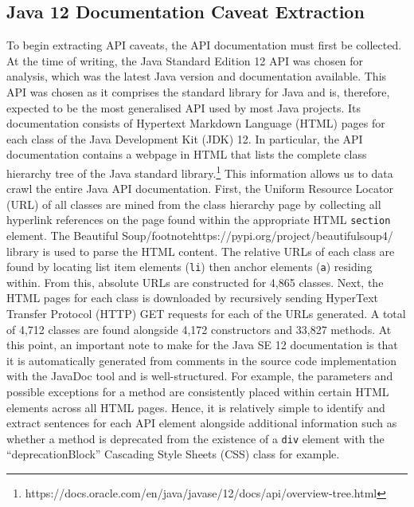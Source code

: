 \subsection{Java 12 Documentation Caveat Extraction}
\label{subsec:info-caveat-extract}
To begin extracting API caveats, the API documentation must first be collected. At the time of writing, the Java Standard Edition 12 API was chosen for analysis, which was the latest Java version and documentation available. This API was chosen as it comprises the standard library for Java and is, therefore, expected to be the most generalised API used by most Java projects. Its documentation consists of Hypertext Markdown Language (HTML) pages for each class of the Java Development Kit (JDK) 12. In particular, the API documentation contains a webpage in HTML that lists the complete class hierarchy tree of the Java standard library.\footnote{https://docs.oracle.com/en/java/javase/12/docs/api/overview-tree.html} This information allows us to data crawl the entire Java API documentation. First, the Uniform Resource Locator (URL) of all classes are mined from the class hierarchy page by collecting all hyperlink references on the page found within the appropriate HTML \lstinline{section} element. The Beautiful Soup/footnote{https://pypi.org/project/beautifulsoup4/} library is used to parse the HTML content. The relative URLs of each class are found by locating list item elements (\lstinline{li}) then anchor elements (\lstinline{a}) residing within. From this, absolute URLs are constructed for 4,865 classes. Next, the HTML pages for each class is downloaded by recursively sending HyperText Transfer Protocol (HTTP) GET requests for each of the URLs generated. A total of 4,712 classes are found alongside 4,172 constructors and 33,827 methods. At this point, an important note to make for the Java SE 12 documentation is that it is automatically generated from comments in the source code implementation with the JavaDoc tool and is well-structured. For example, the parameters and possible exceptions for a method are consistently placed within certain HTML elements across all HTML pages. Hence, it is relatively simple to identify and extract sentences for each API element alongside additional information such as whether a method is deprecated from the existence of a \lstinline{div} element with the ``deprecationBlock'' Cascading Style Sheets (CSS) class for example.\bigbreak

